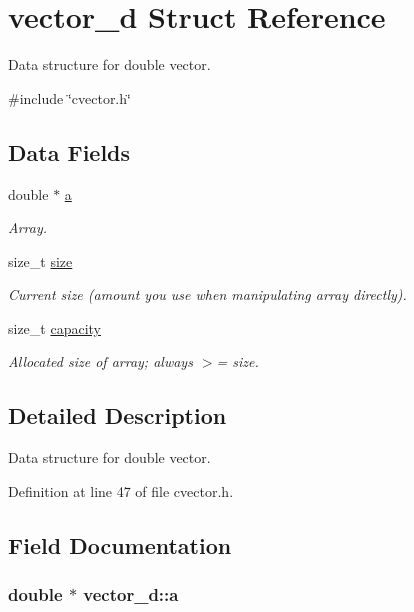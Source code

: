\hypertarget{structvector__d}{\section{vector\-\_\-d Struct Reference}
\label{structvector__d}
}


Data structure for double vector.  




{\ttfamily \#include \char`\"{}cvector.\-h\char`\"{}}

\subsection*{Data Fields}
\begin{DoxyCompactItemize}
\item 
double $\ast$ \hyperlink{structvector__d_a09aad0bb466c581c0f461be152a4bbd9}{a}
\begin{DoxyCompactList}\small\item\em Array. \end{DoxyCompactList}\item 
size\-\_\-t \hyperlink{structvector__d_a1a8bccf26d9cef41fd453f6feb2f15b1}{size}
\begin{DoxyCompactList}\small\item\em Current size (amount you use when manipulating array directly). \end{DoxyCompactList}\item 
size\-\_\-t \hyperlink{structvector__d_a83fb5c9689de179f0dfe1413d720cdc3}{capacity}
\begin{DoxyCompactList}\small\item\em Allocated size of array; always $>$= size. \end{DoxyCompactList}\end{DoxyCompactItemize}


\subsection{Detailed Description}
Data structure for double vector. 



Definition at line 47 of file cvector.\-h.



\subsection{Field Documentation}
\hypertarget{structvector__d_a09aad0bb466c581c0f461be152a4bbd9}{
\subsubsection[{a}]{\setlength{\rightskip}{0pt plus 5cm}double $\ast$ vector\-\_\-d\-::a}}\label{structvector__d_a09aad0bb466c581c0f461be152a4bbd9}


